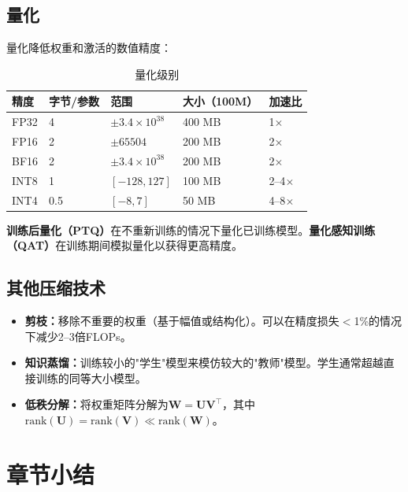 \subsection{量化}

量化降低权重和激活的数值精度：

\begin{table}[ht]
    \centering
    \caption{量化级别}
    \begin{tabular}{L{2cm} L{2.5cm} L{2.5cm} L{2.5cm} L{2.5cm}}
        \toprule
        \textbf{精度} & \textbf{字节/参数} & \textbf{范围} & \textbf{大小（100M）} & \textbf{加速比} \\
        \midrule
        FP32 & 4 & $\pm 3.4\times10^{38}$ & 400 MB & 1$\times$ \\
        FP16 & 2 & $\pm 65504$ & 200 MB & 2$\times$ \\
        BF16 & 2 & $\pm 3.4\times10^{38}$ & 200 MB & 2$\times$ \\
        INT8 & 1 & $[-128, 127]$ & 100 MB & 2--4$\times$ \\
        INT4 & 0.5 & $[-8, 7]$ & 50 MB & 4--8$\times$ \\
        \bottomrule
    \end{tabular}
\end{table}

\textbf{训练后量化（PTQ）}在不重新训练的情况下量化已训练模型。\textbf{量化感知训练（QAT）}在训练期间模拟量化以获得更高精度。

\subsection{其他压缩技术}

\begin{itemize}
    \item \textbf{剪枝：}移除不重要的权重（基于幅值或结构化）。可以在精度损失$<$1\%的情况下减少2--3倍FLOPs。
    \item \textbf{知识蒸馏：}训练较小的"学生"模型来模仿较大的"教师"模型。学生通常超越直接训练的同等大小模型。
    \item \textbf{低秩分解：}将权重矩阵分解为$\mathbf{W} = \mathbf{U}\mathbf{V}^\top$，其中$\text{rank}(\mathbf{U}) = \text{rank}(\mathbf{V}) \ll \text{rank}(\mathbf{W})$。
\end{itemize}

\section{章节小结}

